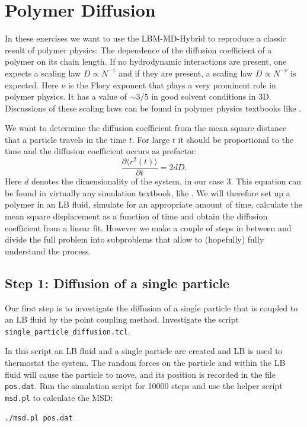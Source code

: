 
\chapter{Polymer Diffusion}
In these exercises we want to use the LBM-MD-Hybrid to reproduce a classic
result of polymer physics: The dependence of the diffusion coefficient
of a polymer on its chain length. If no hydrodynamic interactions
are present, one expects a scaling law $D \propto N^{-1}$ and if 
they are present, a scaling law $D \propto N^{-\nu}$ is expected. 
Here $\nu$ is the Flory exponent that plays a very prominent role
in polymer physics. It has a value of $\sim 3/5$ in good solvent
conditions in 3D. Discussions of these scaling laws can be found
in polymer physics textbooks like \cite{degennes79a, doi96a, rubinstein03a}.


We want to determine the diffusion coefficient from the mean square
distance that a particle travels in the time $t$. For large $t$ it should
be proportional to the time and the diffusion coefficient occurs as 
prefactor: 
\begin{equation}
  \frac{\partial \langle r^2 \left(t\right)\rangle}{\partial t} = 2 d D. 
  \label{eq:msd}
\end{equation}
Here $d$ denotes the dimensionality of the system, in our case 3.
This equation can be found in virtually any simulation textbook, like
\cite{frenkel02b}.
We will therefore set up a polymer in an LB fluid, simulate for an appropriate
amount of time, calculate the mean square displacement as a function of
time and obtain the diffusion coefficient from a linear fit. However
we make a couple of steps in between and divide the full problem into 
subproblems that allow to (hopefully) fully understand the process.

\section{Step 1: Diffusion of a single particle}
Our first step is to investigate the diffusion of a single particle
that is coupled to an LB fluid by the point coupling method.
Investigate the script  \lstinline|single_particle_diffusion.tcl|.

In this script an LB fluid and a single particle are created and LB is
used to thermostat the system. The random forces on the particle and
within the LB fluid will cause the particle to move, and its position
is recorded in the file  \lstinline|pos.dat|. 
Run the simulation script for 10000 steps
and use the helper script  \lstinline|msd.pl| to calculate the MSD: 
{\vspace{0,2cm}\small
\begin{lstlisting}[numbers=none]
./msd.pl pos.dat
\end{lstlisting}\vspace{0,2cm}
}

